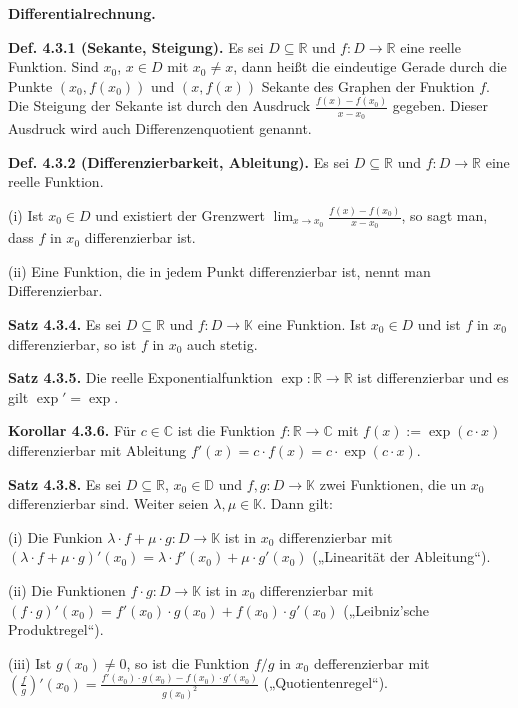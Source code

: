 \textbf{Differentialrechnung.}

\textbf{Def. 4.3.1 (Sekante, Steigung).} Es sei $D \subseteq \mathbb R$ und $f : D \rightarrow \mathbb R$ eine reelle Funktion. Sind $x_0$, $x \in D$ mit $x_0 \neq x$, dann heißt die eindeutige Gerade durch die Punkte $(x_0,f(x_0))$ und $(x,f(x))$ Sekante des Graphen der Fnuktion $f$. Die Steigung der Sekante ist durch den Ausdruck $\frac{f(x)-f(x_0)}{x-x_0}$ gegeben. Dieser Ausdruck wird auch Differenzenquotient genannt.

\textbf{Def. 4.3.2 (Differenzierbarkeit, Ableitung).} Es sei $D \subseteq \mathbb R$ und $f: D \rightarrow \mathbb R$ eine reelle Funktion.

(i) Ist $x_0 \in D$ und existiert der Grenzwert $\lim_{x \rightarrow x_0} \frac{f(x)-f(x_0)}{x-x_0}$, so sagt man, dass $f$ in $x_0$ differenzierbar ist.

(ii) Eine Funktion, die in jedem Punkt differenzierbar ist, nennt man Differenzierbar.

\textbf{Satz 4.3.4.} Es sei $D \subseteq \mathbb R$ und $f : D \rightarrow \mathbb K$ eine Funktion. Ist $x_0 \in D$ und ist $f$ in $x_0$ differenzierbar, so ist $f$ in $x_0$ auch stetig.

\textbf{Satz 4.3.5.} Die reelle Exponentialfunktion $\exp : \mathbb R \rightarrow \mathbb R$ ist differenzierbar und es gilt $\exp' = \exp$.

\textbf{Korollar 4.3.6.} Für $c \in \mathbb C$ ist die Funktion $f:\mathbb R \rightarrow \mathbb C$ mit $f(x) := \exp(c\cdot x)$ differenzierbar mit Ableitung $f'(x) = c \cdot f(x) = c \cdot \exp (c \cdot x)$.

\textbf{Satz 4.3.8.} Es sei $D\subseteq \mathbb R$, $x_0 \in \mathbb D$ und $f,g : D \rightarrow \mathbb K$ zwei Funktionen, die un $x_0$ differenzierbar sind. Weiter seien $\lambda , \mu \in \mathbb K$. Dann gilt:

(i) Die Funkion $\lambda \cdot f + \mu \cdot g : D \rightarrow \mathbb K$ ist in $x_0$ differenzierbar mit $(\lambda \cdot f + \mu \cdot g)' (x_0) = \lambda \cdot f'(x_0) + \mu \cdot g' (x_0)$ („Linearität der Ableitung“).

(ii) Die Funktionen $f\cdot g : D \rightarrow \mathbb K$ ist in $x_0$ differenzierbar mit $(f \cdot g)'(x_0) = f'(x_0)\cdot g(x_0) + f(x_0) \cdot g'(x_0)$ („Leibniz’sche Produktregel“).

(iii) Ist $g(x_0) \neq 0$, so ist die Funktion $f/g$ in $x_0$ defferenzierbar mit $\left(\frac{f}{g}\right)'(x_0) = \frac{f'(x_0)\cdot g(x_0) - f(x_0) \cdot g'(x_0)}{g(x_0)^2}$ („Quotientenregel“).

